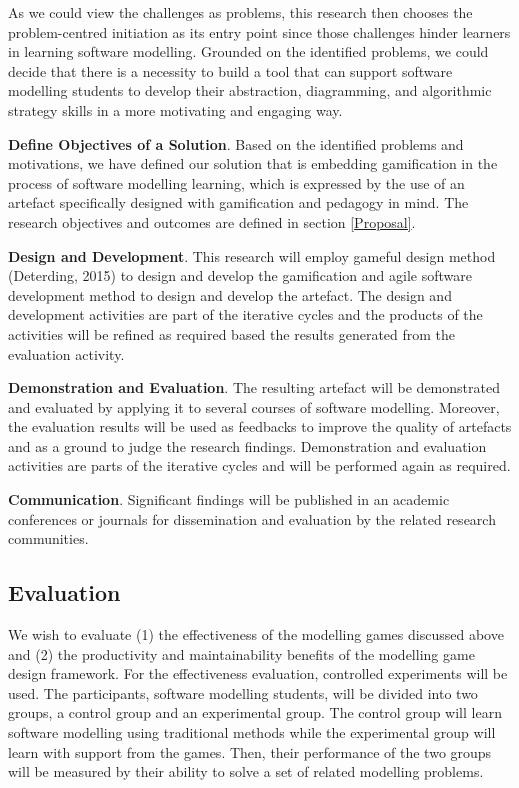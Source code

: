 \documentclass[12pt, a4paper]{report}
\begin{document}
{As we could view the challenges as problems, this research then chooses the problem-centred initiation as its entry point since those challenges hinder learners in learning software modelling. Grounded on the identified problems, we could decide that there is a necessity to build a tool that can support software modelling students to develop their abstraction, diagramming, and algorithmic strategy skills in a more motivating and engaging way. 

\textbf{Define Objectives of a Solution}. Based on the identified problems and motivations, we have defined our solution that is embedding gamification in the process of software modelling learning, which is expressed by the use of an artefact specifically designed with gamification and pedagogy in mind. The research objectives and outcomes are defined in section \ref{Proposal}.

\textbf{Design and Development}. This research will employ gameful design method (Deterding, 2015) to design and develop the gamification and agile software development method to design and develop the artefact. The design and development activities are part of the iterative cycles and the products of the activities will be refined as required based the results generated from the evaluation activity.

\textbf{Demonstration and Evaluation}. The resulting artefact will be demonstrated and evaluated by applying it to several courses of software modelling. Moreover, the evaluation results will be used as feedbacks to improve the quality of artefacts and as a ground to judge the research findings. Demonstration and evaluation activities are parts of the iterative cycles and will be performed again as required. 

\textbf{Communication}. Significant findings will be published in an academic conferences or journals for dissemination and evaluation by the related research communities.

\subsection{Evaluation}
We wish to evaluate (1) the effectiveness of the modelling games discussed above and (2) the productivity and maintainability benefits of the modelling game design framework. For the effectiveness evaluation, controlled experiments will be used. The participants, software modelling students, will be divided into two groups, a control group and an experimental group. The control group will learn software modelling using traditional methods while the experimental group will learn with support from the games. Then, their performance of the two groups will be measured by their ability to solve a set of related modelling problems. 

}
\end{document}
